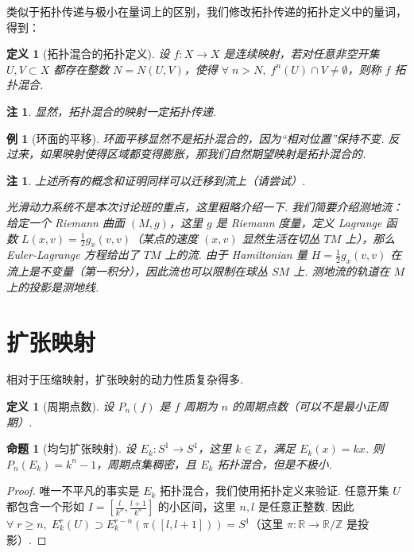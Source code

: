 \documentclass[11pt, a4paper, oneside]{ctexart}
\newtheorem{definition}[theorem]{定义}
\newtheorem{example}[theorem]{例}
\newtheorem{proposition}[theorem]{命题}
\newtheorem{remark}[theorem]{注}
\newcommand{\R}{\mathbb{R}}
\newcommand{\Z}{\mathbb{Z}}
\begin{document}
    类似于拓扑传递与极小在量词上的区别，我们修改拓扑传递的拓扑定义中的量词，得到：
    \begin{definition}[拓扑混合的拓扑定义]
        设 $f:X\to X$ 是连续映射，若对任意非空开集 $U,V\subset X$ 都存在整数 $N=N(U,V)$，使得 $\forall\; n>N,\; f^{n}(U)\cap V\neq\emptyset$，则称 $f$ 拓扑混合.
    \end{definition}
    \begin{remark}
        显然，拓扑混合的映射一定拓扑传递.
    \end{remark}
    \begin{example}[环面的平移]
        环面平移显然不是拓扑混合的，因为“相对位置”保持不变. 反过来，如果映射使得区域都变得膨胀，那我们自然期望映射是拓扑混合的.
    \end{example}

    \begin{remark}
        上述所有的概念和证明同样可以迁移到流上（请尝试）.

        光滑动力系统不是本次讨论班的重点，这里粗略介绍一下. 我们简要介绍测地流：给定一个 Riemann 曲面 $(M,g)$，这里 $g$ 是 Riemann 度量，定义 Lagrange 函数 $L(x,v)=\frac{1}{2}g_x(v,v)$（某点的速度 $(x,v)$ 显然生活在切丛 $TM$ 上），那么 Euler-Lagrange 方程给出了 $TM$ 上的流. 由于 Hamiltonian 量 $H=\frac{1}{2}g_x(v,v)$ 在流上是不变量（第一积分），因此流也可以限制在球丛 $SM$ 上. 测地流的轨道在 $M$ 上的投影是测地线.
    \end{remark}

    \section{扩张映射}
    相对于压缩映射，扩张映射的动力性质复杂得多.
    \begin{definition}[周期点数]
        设 $P_n(f)$ 是 $f$ 周期为 $n$ 的周期点数（可以不是最小正周期）.
    \end{definition}
    \begin{proposition}[均匀扩张映射]
        设 $E_k:S^1\to S^1$，这里 $k\in\Z$，满足 $E_k(x)=kx$. 则 $P_n(E_k)=k^n-1$，周期点集稠密，且 $E_k$ 拓扑混合，但是不极小.
    \end{proposition}
    \begin{proof}
        唯一不平凡的事实是 $E_k$ 拓扑混合，我们使用拓扑定义来验证. 任意开集 $U$ 都包含一个形如 $I=[\frac{l}{k^n},\frac{l+1}{k^n}]$ 的小区间，这里 $n,l$ 是任意正整数. 因此 $\forall\; r\geq n,\; E_k^{r}(U)\supset E_k^{r-n}(\pi([l,l+1]))=S^1$（这里 $\pi:\R\to \R/\Z$ 是投影）.
    \end{proof}
\end{document}
